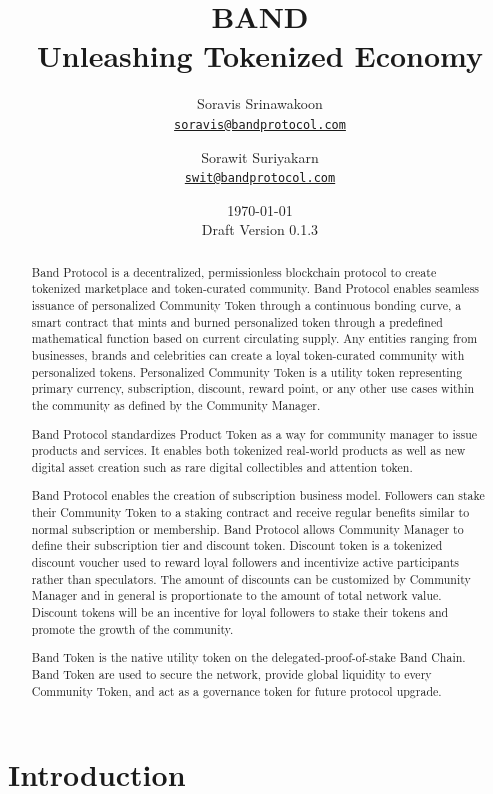 \documentclass[letterpaper,11pt]{article}
\title{\LARGE BAND\\
    \Large Unleashing Tokenized Economy}
\author{
        Soravis Srinawakoon\\
        \small\href{mailto:soravis@bandprotocol.com}
            {\nolinkurl{soravis@bandprotocol.com}}
    \and
        Sorawit Suriyakarn\\
        \small\href{mailto:swit@bandprotocol.com}
            {\nolinkurl{swit@bandprotocol.com}}
    }
\date{\today\\\small Draft Version 0.1.3}
\begin{document}
\maketitle

\begin{abstract}

Band Protocol is a decentralized, permissionless blockchain protocol to create tokenized marketplace and token-curated community. Band Protocol enables seamless issuance of personalized Community Token through a continuous bonding curve, a smart contract that mints and burned personalized token through a predefined mathematical function based on current circulating supply. Any entities ranging from businesses, brands and celebrities can create a loyal token-curated community with personalized tokens. Personalized Community Token is a utility token representing primary currency, subscription, discount, reward point, or any other use cases within the community as defined by the Community Manager.

Band Protocol standardizes Product Token as a way for community manager to issue products and services. It enables both tokenized real-world products as well as new digital asset creation such as rare digital collectibles and attention token.

Band Protocol enables the creation of subscription business model. Followers can stake their Community Token to a staking contract and receive regular benefits similar to normal subscription or membership. Band Protocol allows Community Manager to define their subscription tier and discount token. Discount token is a tokenized discount voucher used to reward loyal followers and incentivize active participants rather than speculators. The amount of discounts can be customized by Community Manager and in general is proportionate to the amount of total network value. Discount tokens will be an incentive for loyal followers to stake their tokens and promote the growth of the community.

Band Token is the native utility token on the delegated-proof-of-stake Band Chain. Band Token are used to secure the network, provide global liquidity to every Community Token, and act as a governance token for future protocol upgrade.

\end{abstract}

\newpage
{
\hypersetup{linkcolor=black}
\tableofcontents
}
\newpage

\section{Introduction}
\end{document}
